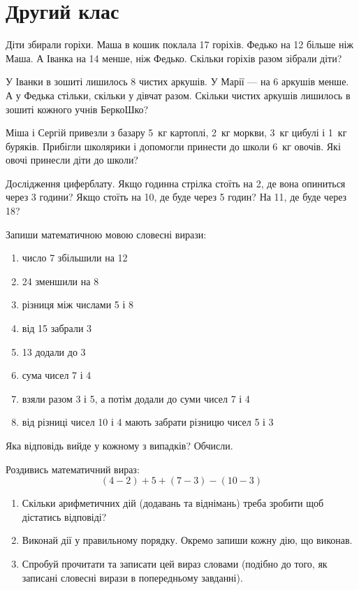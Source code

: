 \chapter{Другий клас}

\problem
Діти збирали горіхи. Маша в кошик поклала 17 горіхів.
Федько на 12 більше ніж Маша. А Іванка на 14 менше, ніж Федько.
Скільки горіхів разом зібрали діти?


\problem
У Іванки в зошиті лишилось 8 чистих аркушів.
У Марії --- на 6 аркушів менше.
А у Федька стільки, скільки у дівчат разом.
Скільки чистих аркушів лишилось в зошиті кожного учнів БеркоШко?


\problem
Міша і Сергій привезли з базару 5~кг картоплі, 2~кг моркви,
3~кг цибулі і 1~кг буряків.
Прибігли школярики і допомогли принести до школи 6~кг овочів.
Які овочі принесли діти до школи?


\problem
Дослідження циферблату.
Якщо годинна стрілка стоїть на 2, де вона опиниться через 3 години?
Якщо стоїть на 10, де буде через 5 годин?
На 11, де буде через 18?


\problem
Запиши математичною мовою словесні вирази:
\begin{enumerate}
    \item число 7 збільшили на 12
    \item 24 зменшили на 8
    \item різниця між числами 5 і 8
    \item від 15 забрали 3
    \item 13 додали до 3
    \item сума чисел 7 і 4
    \item взяли разом 3 і 5, а потім додали до суми чисел 7 і 4
    \item від різниці чисел 10 і 4 мають забрати різницю чисел 5 і 3
\end{enumerate}
Яка відповідь вийде у кожному з випадків? Обчисли.


\problem
Роздивись математичний вираз:
\[
(4 - 2) + 5 + (7 - 3) - (10 - 3)
\]
\begin{enumerate}
    \item Скільки арифметичних дій (додавань та віднімань)
    треба зробити щоб дістатись відповіді?
    \item Виконай дії у правильному порядку.
    Окремо запиши кожну дію, що виконав.
    \item Спробуй прочитати та записати цей вираз словами
    (подібно до того, як записані словесні вирази в попередньому завданні).
\end{enumerate}


